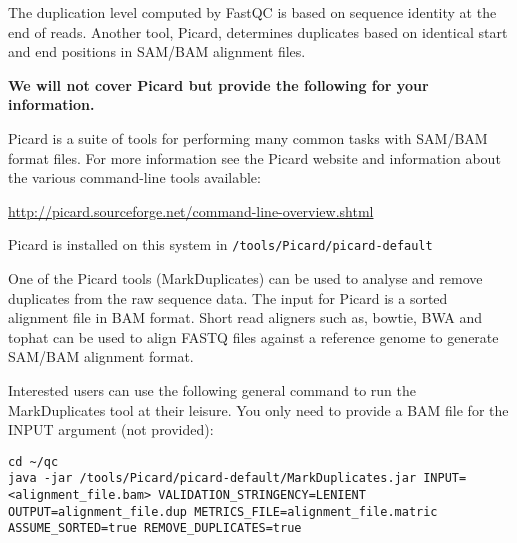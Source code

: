 \begin{advanced}
\begin{information}
The duplication level computed by FastQC is based on sequence identity at the
end of reads. Another tool, Picard, determines duplicates based on identical
start and end positions in SAM/BAM alignment files.

\textbf{We will not cover Picard but
provide the following for your information.}

Picard is a suite of tools for performing many common tasks with SAM/BAM format
files. For more information see the Picard website and information about the
various command-line tools available:

\url{http://picard.sourceforge.net/command-line-overview.shtml}
\end{information}

\begin{information}
Picard is installed on this system in \texttt{/tools/Picard/picard-default}

One of the Picard tools (MarkDuplicates) can be used to analyse and remove
duplicates from the raw sequence data. The input for Picard is a sorted
alignment file in BAM format. Short read aligners such as, bowtie, BWA and tophat
can be used to align FASTQ files against a reference genome to generate
SAM/BAM alignment format.
\end{information}

\begin{steps}
Interested users can use the following general command to run the
MarkDuplicates tool at their leisure. You only need to provide a BAM file for the
INPUT argument (not provided):


\begin{lstlisting}[style=command_syntax]
cd ~/qc
java -jar /tools/Picard/picard-default/MarkDuplicates.jar INPUT=<alignment_file.bam> VALIDATION_STRINGENCY=LENIENT OUTPUT=alignment_file.dup METRICS_FILE=alignment_file.matric ASSUME_SORTED=true REMOVE_DUPLICATES=true

\end{lstlisting}
\end{steps}

\end{advanced}
